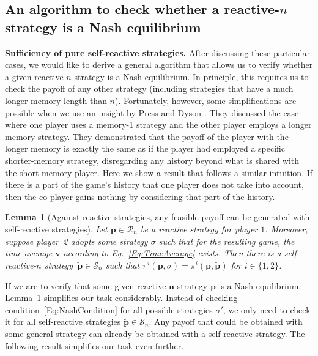 \documentclass[11pt]{article}
\theoremstyle{plainCl1}
\newtheorem{lemma}{Lemma}
\theoremstyle{plainCl2}
\begin{document}

\subsection{An algorithm to check whether a reactive-$n$ strategy is a Nash equilibrium}

{\bf Sufficiency of pure self-reactive strategies.}
After discussing these particular cases, we would like to derive a general algorithm that allows us to verify whether a given reactive-$n$ strategy is a Nash equilibrium. 
In principle, this requires us to check the payoff of any other strategy (including strategies that have a much longer memory length than $n$). Fortunately, however, some simplifications are possible when we use an insight by Press and Dyson \cite{press:PNAS:2012}.
They discussed the case where one player uses a memory-1
strategy and the other player employs a longer memory strategy. They
demonstrated that the payoff of the player with the longer memory is exactly the
same as if the player had employed a specific shorter-memory strategy,
disregarding any history beyond what is shared with the short-memory player.
Here we show a result that follows a similar intuition. 
If there is a part of the game's history that one player does not take into account, then the co-player gains nothing by
considering that part of the history. 

\begin{lemma}[Against reactive strategies, any feasible payoff can be generated with self-reactive strategies] \label{lemma:self_reactive_sufficiency}
 Let $\mathbf{p}\!\in\!\mathcal{R}_n$ be a reactive strategy for player $1$. 
 Moreover, suppose player~2 adopts some strategy $\sigma$ such that for the resulting game, the time average $\mathbf{v}$ according to Eq.~\eqref{Eq:TimeAverage} exists. 
 Then there is a self-reactive-$n$ strategy~$\mathbf{\tilde p}\!\in\!\mathcal{S}_n$ such that $\pi^i(\mathbf{p},\sigma)\! = \!\pi^i(\mathbf{p},\mathbf{\tilde{p}})$ for $i\!\in\!\{1,2\}$.
\end{lemma}

\noindent
If we are to verify that some given reactive-$\mathbf{n}$ strategy $\mathbf{p}$ is a Nash equilibrium, Lemma~\ref{lemma:self_reactive_sufficiency} simplifies our task considerably. 
Instead of checking condition~\eqref{Eq:NashCondition} for all possible strategies $\sigma'$, we only need to check it for all self-reactive strategies $\mathbf{\tilde{p}}\!\in\! \mathcal{S}_n$. 
Any payoff that could be obtained with some general strategy can already be obtained with a self-reactive strategy. 
The following result simplifies our task even further. 
\end{document}
